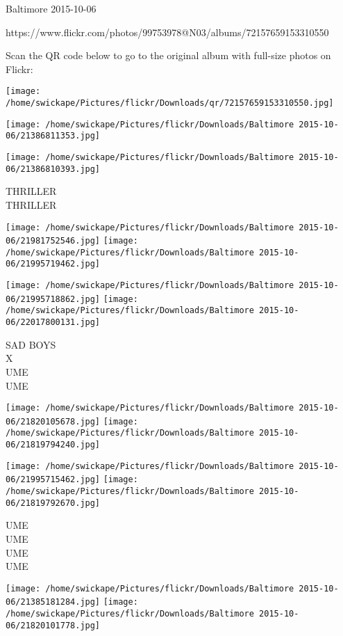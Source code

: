 \documentclass[10pt,letterpaper]{article}
\begin{document}
Baltimore 2015-10-06

https://www.flickr.com/photos/99753978@N03/albums/72157659153310550

Scan the QR code below to go to the original album with full-size photos on Flickr:

\texttt{[image: /home/swickape/Pictures/flickr/Downloads/qr/72157659153310550.jpg]}
\pagebreak

\texttt{[image: /home/swickape/Pictures/flickr/Downloads/Baltimore 2015-10-06/21386811353.jpg]}

\vspace{0.25in}
\texttt{[image: /home/swickape/Pictures/flickr/Downloads/Baltimore 2015-10-06/21386810393.jpg]}

THRILLER\\
THRILLER\\
\pagebreak

\texttt{[image: /home/swickape/Pictures/flickr/Downloads/Baltimore 2015-10-06/21981752546.jpg]}
\texttt{[image: /home/swickape/Pictures/flickr/Downloads/Baltimore 2015-10-06/21995719462.jpg]}

\texttt{[image: /home/swickape/Pictures/flickr/Downloads/Baltimore 2015-10-06/21995718862.jpg]}
\texttt{[image: /home/swickape/Pictures/flickr/Downloads/Baltimore 2015-10-06/22017800131.jpg]}

SAD BOYS\\
X\\
UME\\
UME\\
\pagebreak

\texttt{[image: /home/swickape/Pictures/flickr/Downloads/Baltimore 2015-10-06/21820105678.jpg]}
\texttt{[image: /home/swickape/Pictures/flickr/Downloads/Baltimore 2015-10-06/21819794240.jpg]}

\texttt{[image: /home/swickape/Pictures/flickr/Downloads/Baltimore 2015-10-06/21995715462.jpg]}
\texttt{[image: /home/swickape/Pictures/flickr/Downloads/Baltimore 2015-10-06/21819792670.jpg]}

UME\\
UME\\
UME\\
UME\\
\pagebreak

\texttt{[image: /home/swickape/Pictures/flickr/Downloads/Baltimore 2015-10-06/21385181284.jpg]}
\texttt{[image: /home/swickape/Pictures/flickr/Downloads/Baltimore 2015-10-06/21820101778.jpg]}
\end{document}
